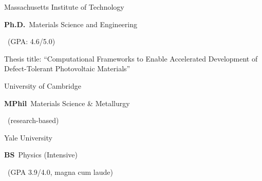 	{Massachusetts Institute of Technology}
	{\textbf{Ph.D.}~Materials Science and Engineering
		\begin{footnotesize}
		~(GPA: 4.6/5.0)
        \end{footnotesize}}
	{Thesis title: ``Computational Frameworks to Enable Accelerated Development of Defect-Tolerant Photovoltaic Materials''}

\vspace{-3mm}
		{University of Cambridge}
		{\textbf{MPhil}~Materials Science \& Metallurgy
			\begin{footnotesize}
            ~(research-based)
            \end{footnotesize}}
		{}
		
\vspace{-3mm}	
		{Yale University}
		{\textbf{BS}~Physics (Intensive)
			\begin{footnotesize}
                ~(GPA 3.9/4.0, magna cum laude)
            \end{footnotesize}}
		{}
